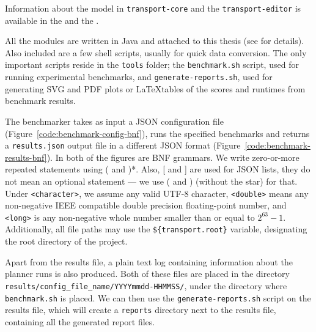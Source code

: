 Information about the model in \texttt{transport-core} and the \texttt{transport-editor} is available in the  and the .

All the modules are written in Java and attached to this thesis (see  for details). Also included are a few shell scripts, usually for quick
data conversion. The only important scripts reside in the \texttt{tools} folder;
the \texttt{benchmark.sh} script, used for running experimental benchmarks,
and \texttt{generate-reports.sh}, used for generating SVG and PDF plots or \LaTeX tables of the scores and runtimes from benchmark results.

The benchmarker takes as input a JSON \citep{Bray2014} configuration file (Figure~\ref{code:benchmark-config-bnf}),
runs the specified benchmarks and returns a \texttt{results.json} output file in a different JSON format (Figure~\ref{code:benchmark-results-bnf}).
In both of the figures are BNF grammars. We write zero-or-more repeated statements using ( and )*. Also, [ and ] are used for JSON lists, they do not mean an optional statement --- we use ( and ) (without the star) for that.
Under \texttt{<character>}, we assume any valid UTF-8 character,
\texttt{<double>} means any non-negative IEEE compatible double precision floating-point number,
and \texttt{<long>} is any non-negative whole number smaller than or equal to $2^{63}-1$.
Additionally, all file paths may use the \verb+${transport.root}+ variable, designating the
root directory of the project.

Apart from the results file, a plain text log containing information about the planner
runs is also produced. Both of these files are placed in the directory \texttt{results/config\_file\_name/YYYYmmdd-HHMMSS/}, under the directory where \texttt{benchmark.sh} is placed.
We can then use the \texttt{generate-reports.sh} script on the results file,
which will create a \texttt{reports} directory next to the results file,
containing all the generated report files.

